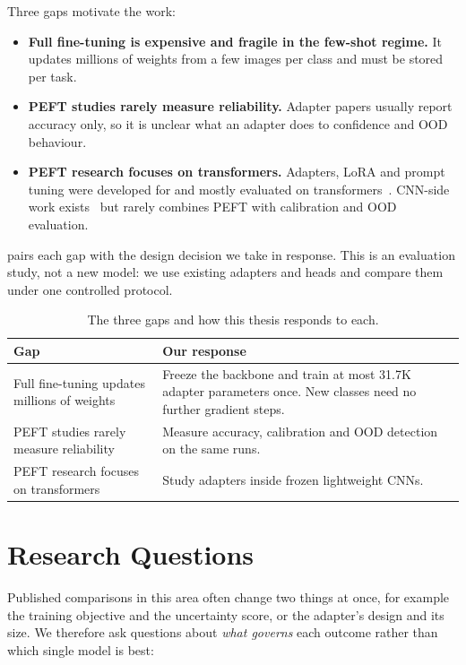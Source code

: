 Three gaps motivate the work:
\begin{itemize}
\item \textbf{Full fine-tuning is expensive and fragile in the few-shot regime.} It updates millions of
weights from a few images per class and must be stored per task.
\item \textbf{PEFT studies rarely measure reliability.} Adapter papers usually report accuracy only, so
it is unclear what an adapter does to confidence and OOD behaviour.
\item \textbf{PEFT research focuses on transformers.} Adapters, LoRA and prompt tuning were developed
for and mostly evaluated on transformers~\cite{houlsby2019adapters,hu2022lora,jia2022vpt,chen2022adaptformer}.
CNN-side work exists~\cite{chen2024convadapter,li2022tsa,aleem2024convlora,zhong2024convlora} but rarely
combines PEFT with calibration and OOD evaluation.
\end{itemize}

 pairs each gap with the design decision we take in response. This is an
evaluation study, not a new model: we use existing adapters and heads and compare them under one
controlled protocol.

\begin{table}[H]
\centering
\caption{The three gaps and how this thesis responds to each.}
\label{tab:challenges}
\begin{tabularx}{\textwidth}{@{}>{\raggedright\arraybackslash}p{5.2cm}X@{}}
\toprule
Gap & Our response \\
\midrule
Full fine-tuning updates millions of weights & Freeze the backbone and train at most 31.7K adapter
parameters once. New classes need no further gradient steps. \\
PEFT studies rarely measure reliability & Measure accuracy, calibration and OOD detection on the same
runs. \\
PEFT research focuses on transformers & Study adapters inside frozen lightweight CNNs. \\
\bottomrule
\end{tabularx}
\end{table}

\section{Research Questions}

Published comparisons in this area often change two things at once, for example the training objective
and the uncertainty score, or the adapter's design and its size. We therefore ask questions about
\emph{what governs} each outcome rather than which single model is best:

